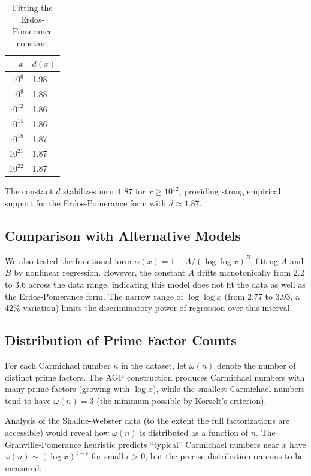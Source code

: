 \documentclass{amsart}
\theoremstyle{plain}
\theoremstyle{definition}
\theoremstyle{remark}
\begin{document}
\begin{table}[ht]
\centering
\caption{Fitting the Erdos-Pomerance constant}\label{tab:erdos-fit}
\begin{tabular}{rl}
\toprule
$x$ & $d(x)$ \\
\midrule
$10^{6}$ & 1.98 \\
$10^{9}$ & 1.88 \\
$10^{12}$ & 1.86 \\
$10^{15}$ & 1.86 \\
$10^{18}$ & 1.87 \\
$10^{21}$ & 1.87 \\
$10^{22}$ & 1.87 \\
\bottomrule
\end{tabular}
\end{table}

The constant $d$ stabilizes near $1.87$ for $x \ge 10^{12}$, providing strong empirical support for the Erdos-Pomerance form with $d \approx 1.87$.

\subsection{Comparison with Alternative Models}

We also tested the functional form $\alpha(x) = 1 - A / (\log \log x)^B$, fitting $A$ and $B$ by nonlinear regression. However, the constant $A$ drifts monotonically from 2.2 to 3.6 across the data range, indicating this model does not fit the data as well as the Erdos-Pomerance form. The narrow range of $\log \log x$ (from 2.77 to 3.93, a 42\% variation) limits the discriminatory power of regression over this interval.

\subsection{Distribution of Prime Factor Counts}

For each Carmichael number $n$ in the dataset, let $\omega(n)$ denote the number of distinct prime factors. The AGP construction produces Carmichael numbers with many prime factors (growing with $\log x$), while the smallest Carmichael numbers tend to have $\omega(n) = 3$ (the minimum possible by Korselt's criterion).

Analysis of the Shallue-Webster data (to the extent the full factorizations are accessible) would reveal how $\omega(n)$ is distributed as a function of $n$. The Granville-Pomerance heuristic predicts ``typical'' Carmichael numbers near $x$ have $\omega(n) \sim (\log x)^{1-\epsilon}$ for small $\epsilon > 0$, but the precise distribution remains to be measured.
\end{document}
